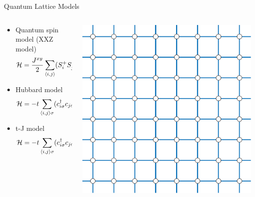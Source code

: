 \begin{frame}{Quantum Lattice Models}
  \begin{columns}[T]
    \begin{column}{.8\textwidth}
      \begin{itemize}
      \item Quantum spin model (XXZ model) \begin{equation*} {\cal H} = \frac{J^{xy}}{2}
        \sum_{\langle i,j \rangle} (S^+_i S^-_j + S^-_i S^+_j) + J^z
        \sum_{\langle i,j \rangle} S^z_i S^z_j \end{equation*}
      \item Hubbard model \begin{equation*} {\cal H} = -t \sum_{\langle i,j \rangle \sigma}
        (c^\dagger_{i\sigma} c_{j\sigma} + \mbox{h.c.}) + U \sum_{i}
        n_{i\uparrow} n_{i\downarrow} \end{equation*}
      \item t-J model\begin{equation*} {\cal H} = -t \sum_{\langle i,j \rangle \sigma}
        (c^\dagger_{i\sigma} c_{j\sigma} + \mbox{h.c.}) + J \sum_{i,j}
        ({\bf S}_i \cdot {\bf S}_j - n_{i} n_{j} / 4) \end{equation*}
      \end{itemize}
    \end{column}
    \begin{column}{.2\textwidth}
      \includegraphics[width=\textwidth]{square.pdf}
    \end{column}
  \end{columns}
\end{frame}

